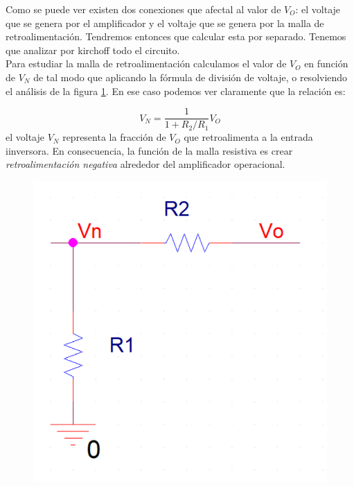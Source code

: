 \documentclass[12pt,a4paper]{article}
\numberwithin{equation}{section}
\numberwithin{figure}{section}
\begin{document}
Como se puede ver existen dos conexiones que afectal al valor de $V_O$: el voltaje que se genera por el amplificador y el voltaje que se genera por la malla de retroalimentación. Tendremos entonces que calcular esta por separado. Tenemos que analizar por kirchoff todo el circuito. \\

Para estudiar la malla de retroalimentación calculamos el valor de $V_O$ en función de $V_N$ de tal modo que aplicando la fórmula de división de voltaje, o resolviendo el análisis de la figura \ref{Fig:1.3-Amplificador-inversor-3}. En ese caso podemos ver claramente que la relación es:

\begin{equation}
V_N = \dfrac{1}{1+R_2/R_1} V_O
\end{equation}
el voltaje $V_N$ representa la fracción de $V_O$ que retroalimenta a la entrada iinversora. En consecuencia, la función de la malla resistiva es crear \textit{retroalimentación negativa} alrededor del amplificador operacional. \\


\begin{figure}[h!] \centering
\includegraphics[scale=0.35]{1.3-Amplificador-inversor-3.png}
\caption{}
\label{Fig:1.3-Amplificador-inversor-3}
\end{figure} 
\end{document}
